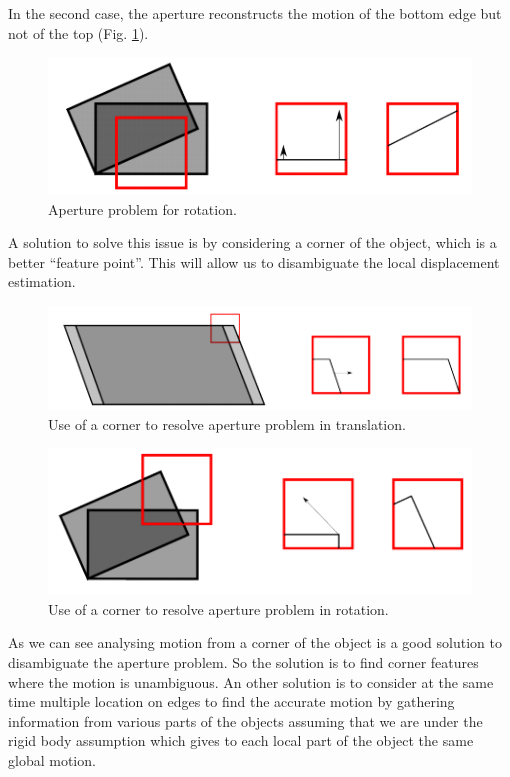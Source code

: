 \documentclass[a4paper]{article}
\begin{document}
In the second case, the aperture reconstructs the motion of the bottom edge but not of the top (Fig. \ref{fig:aperture_rotation}).
\begin{figure}[H]
    \centering
    \includegraphics[scale=0.8]{img/opt_flow/aperture_rotation.PNG}
    \caption{Aperture problem for rotation.}
    \label{fig:aperture_rotation}
\end{figure}
A solution to solve this issue is by considering a corner of the object, which is a better ``feature point''. This  will allow us to disambiguate the local displacement estimation.
\begin{figure}[H]
    \centering
    \includegraphics[scale=0.8]{img/opt_flow/aperture_corner.PNG}
    \caption{Use of a corner to resolve aperture problem in translation.}
\end{figure}
\begin{figure}[H]
    \centering
    \includegraphics[scale=0.8]{img/opt_flow/aperture_corner2.PNG}
    \caption{Use of a corner to resolve aperture problem in rotation.}
\end{figure}
As we can see analysing motion from a corner of the object is a good solution to disambiguate
the aperture problem. So the solution is to find corner features where the motion is unambiguous.
An other solution is to consider at the same time multiple location on edges to find the accurate
motion by gathering information from various parts of the objects assuming that we are under the
rigid body assumption which gives to each local part of the object the same global motion.
\end{document}
